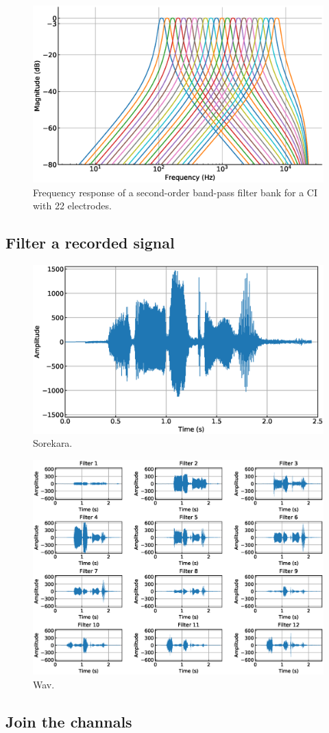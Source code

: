 \documentclass{scrartcl}			%
\begin{document}
\begin{figure}[H]
\includegraphics[width=\linewidth]{imgs/ci_with_22_electrodes.eps}
    \caption{Frequency response of a second-order  band-pass filter bank for a CI with 22 electrodes.} 
    \label{fig:ci_22} 
\end{figure}

\subsection{Filter a recorded signal}
\begin{figure}[H]
\includegraphics[width=\linewidth]{imgs/sorekara.eps}
    \caption{Sorekara.} 
    \label{fig:sore} 
\end{figure}

\begin{figure}[H]
\includegraphics[width=\linewidth]{imgs/wav_results.eps}
    \caption{Wav.} 
    \label{fig:sore} 
\end{figure}
\subsection{Join the channals}
\end{document}
